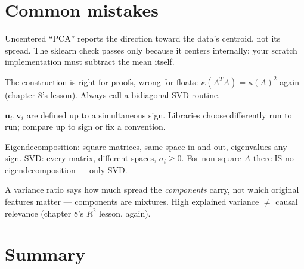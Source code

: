 \section{Common mistakes}\label{sec:svd-mistakes}

\begin{tripwire}
Uncentered ``PCA'' reports the direction toward the data's centroid, not
its spread. The sklearn check passes only because it centers internally;
your scratch implementation must subtract the mean itself.
\end{tripwire}

\begin{tripwire}
The construction is right for proofs, wrong for floats: $\kappa(A^{T}A)
=\kappa(A)^{2}$ again (chapter 8's lesson). Always call a bidiagonal SVD
routine.
\end{tripwire}

\begin{tripwire}
$\mathbf u_i,\mathbf v_i$ are defined up to a simultaneous sign. Libraries
choose differently run to run; compare up to sign or fix a convention.
\end{tripwire}

\begin{tripwire}
Eigendecomposition: square matrices, same space in and out, eigenvalues
any sign. SVD: every matrix, different spaces, $\sigma_i\ge0$. For
non-square $A$ there IS no eigendecomposition --- only SVD.
\end{tripwire}

\begin{tripwire}
A variance ratio says how much spread the \emph{components} carry, not
which original features matter --- components are mixtures. High
explained variance $\ne$ causal relevance (chapter 8's $R^{2}$ lesson,
again).
\end{tripwire}

\section{Summary}

